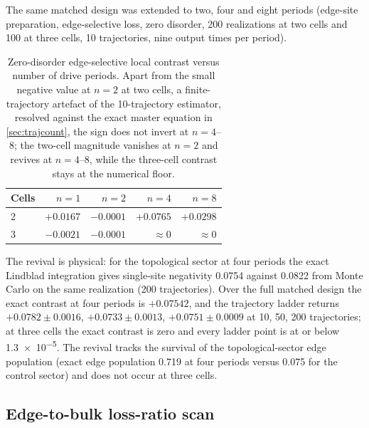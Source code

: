 \documentclass[aps,pra,preprint,superscriptaddress,amsmath,amssymb]{revtex4-2}
\begin{document}
The same matched design was extended to two, four and eight periods (edge-site preparation, edge-selective loss, zero disorder, \num{200} realizations at two cells and \num{100} at three cells, \num{10} trajectories, nine output times per period).

\begin{table}[h]
\caption{Zero-disorder edge-selective local contrast versus number of drive periods. Apart from the small negative value at $n=\num{2}$ at two cells, a finite-trajectory artefact of the \num{10}-trajectory estimator, resolved against the exact master equation in \cref{sec:trajcount}, the sign does not invert at $n=\num{4}$--\num{8}; the two-cell magnitude vanishes at $n=\num{2}$ and revives at $n=\num{4}$--\num{8}, while the three-cell contrast stays at the numerical floor.}
\label{tab:multiperiod}
\begin{ruledtabular}
\begin{tabular}{lrrrr}
Cells & $n=\num{1}$ & $n=\num{2}$ & $n=\num{4}$ & $n=\num{8}$ \\
\hline
\num{2} & $+\num{0.0167}$ & $-\num{0.0001}$ & $+\num{0.0765}$ & $+\num{0.0298}$ \\
\num{3} & $-\num{0.0021}$ & $-\num{0.0001}$ & $\approx\num{0}$ & $\approx\num{0}$ \\
\end{tabular}
\end{ruledtabular}
\end{table}

The revival is physical: for the topological sector at four periods the exact Lindblad integration gives single-site negativity \num{0.0754} against \num{0.0822} from Monte Carlo on the same realization (\num{200} trajectories). Over the full matched design the exact contrast at four periods is $+\num{0.07542}$, and the trajectory ladder returns $+\num{0.0782}\pm\num{0.0016}$, $+\num{0.0733}\pm\num{0.0013}$, $+\num{0.0751}\pm\num{0.0009}$ at \num{10}, \num{50}, \num{200} trajectories; at three cells the exact contrast is zero and every ladder point is at or below \num{1.3e-5}. The revival tracks the survival of the topological-sector edge population (exact edge population \num{0.719} at four periods versus \num{0.075} for the control sector) and does not occur at three cells.

\subsection{Edge-to-bulk loss-ratio scan}
\label{sec:lossratio}
\end{document}
